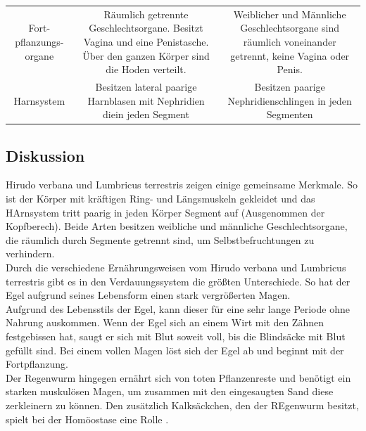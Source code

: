 \documentclass[oneside,10pt,a4paper]{report}
\begin{document}
\begin{table}[H]
\begin{tabular}{c c c}
						& &\\
						\midrule
						\multirow{4}{*}{\parbox[t]{2cm}{Fort- pflanzungs- organe}} & \multirow{4}{*}{\parbox[t]{6cm}{Räumlich getrennte Geschlechtsorgane. Besitzt Vagina und eine Penistasche. Über den ganzen Körper sind die Hoden verteilt.}}&\multirow{4}{*}{\parbox[t]{6cm}{Weiblicher und Männliche Geschlechtsorgane sind räumlich voneinander getrennt, keine Vagina oder Penis.}}\\
						& &\\
						&&\\
						&&\\
						\midrule
						\multirow{2}{*}{\parbox[t]{2cm}{Harnsystem}}& \multirow{2}{*}{\parbox[t]{6cm}{Besitzen lateral paarige  Harnblasen mit Nephridien diein jeden Segment}}&\multirow{2}{*}{\parbox[t]{6cm}{Besitzen paarige Nephridienschlingen in jeden Segmenten}}\\
						& &\\
						\bottomrule
					\end{tabular}
				\end{table}
				
			\subsection{Diskussion}
				Hirudo verbana und Lumbricus terrestris zeigen einige gemeinsame Merkmale. So ist der Körper mit kräftigen Ring- und Längsmuskeln gekleidet und das HArnsystem tritt paarig in jeden Körper Segment auf (Ausgenommen der Kopfberech). Beide Arten besitzen weibliche und männliche Geschlechtsorgane, die räumlich durch Segmente getrennt sind, um Selbstbefruchtungen zu verhindern.\\
				Durch die verschiedene Ernährungsweisen vom Hirudo verbana und Lumbricus terrestris gibt es in den Verdauungssystem die größten Unterschiede. So hat der Egel aufgrund seines Lebensform einen stark vergrößerten Magen.\\
				Aufgrund des Lebensstils der Egel, kann dieser für eine sehr lange Periode ohne Nahrung auskommen. Wenn der Egel sich an einem Wirt mit den Zähnen festgebissen hat, saugt er sich mit Blut soweit voll, bis die Blindsäcke mit Blut gefüllt sind. Bei einem vollen Magen löst sich der Egel ab und beginnt mit der Fortpflanzung.\\
				Der Regenwurm hingegen ernährt sich von toten Pflanzenreste und benötigt ein starken muskulösen Magen, um zusammen mit den eingesaugten Sand diese zerkleinern zu können. Den zusätzlich Kalksäckchen, den der REgenwurm besitzt, spielt bei der Homöostase eine Rolle \cite{Kühkental}. 
				
\end{document}

